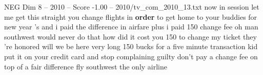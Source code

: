 \begin{textsample}{NEG Dim 8 – 2010 – Score -1.00 – 2010/tv\_com\_2010\_13.txt}  \label{ex:f8_neg_047}
now in session let me get this straight you change flights in \textbf{order} to get home to your buddies for new year 's and i paid the difference in airfare plus i paid 150 change fee oh man southwest would never do that how did it cost you 150 to change my ticket they 're honored will we be here very long 150 bucks for a five minute transaction kid put it on your credit card and stop complaining guilty don't pay a change fee on top of a fair difference fly southwest the only airline

\end{textsample}
